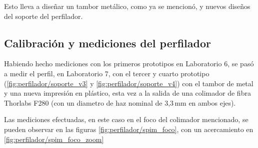 Esto lleva a diseñar un tambor metálico, como ya se mencionó, y nuevos diseños del soporte del perfilador.

\subsection{Calibración y mediciones del perfilador}
Habiendo hecho mediciones con los primeros prototipos en Laboratorio 6, se pasó a medir el perfil, en Laboratorio 7, con el tercer y cuarto prototipo (\ref{fig:perfilador/soporte_v3} y \ref{fig:perfilador/soporte_v4}) con el tambor de metal y una nueva impresión en plástico, esta vez a la salida de una colimador de fibra Thorlabs F280\cite{thorlabs_fc} (con un diametro de haz nominal de 3,3$\,$mm en ambos ejes). 

Las mediciones efectuadas, en este caso en el foco del colimador mencionado, se pueden observar en las figuras \ref{fig:perfilador/spim_foco}, con un acercamiento en \ref{fig:perfilador/spim_foco_zoom}

